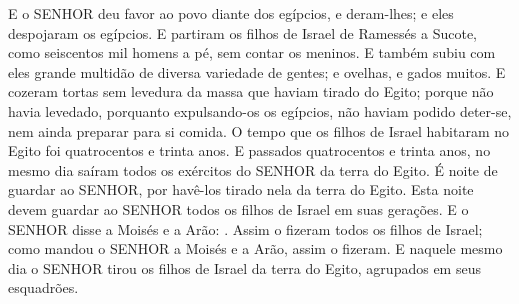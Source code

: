{  E o SENHOR deu favor ao povo diante dos egípcios, e deram-lhes; e eles despojaram os egípcios.
  E partiram os filhos de Israel de Ramessés a Sucote, como seiscentos mil homens a pé, sem contar os meninos.
  E também subiu com eles grande multidão de diversa variedade de gentes; e ovelhas, e gados muitos. %
  E cozeram tortas sem levedura da massa que haviam tirado do Egito; porque não havia levedado, porquanto expulsando-os os egípcios, não haviam podido deter-se, nem ainda preparar para si comida.
  O tempo que os filhos de Israel habitaram no Egito foi quatrocentos e trinta anos.
  E passados quatrocentos e trinta anos, no mesmo dia saíram todos os exércitos do SENHOR da terra do Egito.
  É noite de guardar ao SENHOR, por havê-los tirado nela da terra do Egito. Esta noite devem guardar ao SENHOR todos os filhos de Israel em suas gerações.
  E o SENHOR disse a Moisés e a Arão: .
  Assim o fizeram todos os filhos de Israel; como mandou o SENHOR a Moisés e a Arão, assim o fizeram.
  E naquele mesmo dia o SENHOR tirou os filhos de Israel da terra do Egito, agrupados em seus esquadrões.
\par }

